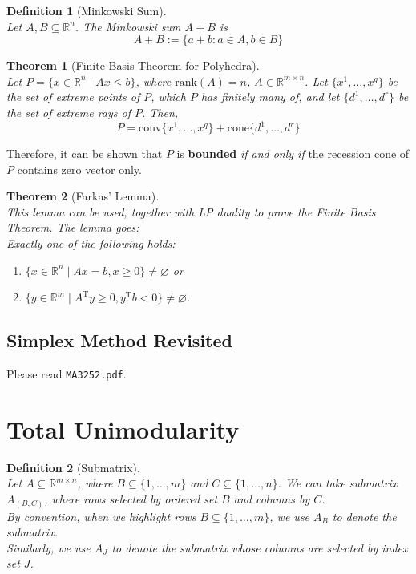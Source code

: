 \documentclass[12pt]{article}
\newcommand{\rank}{\mathrm{rank}}
\newcommand{\T}{\mathrm{T}}
\newcommand{\cone}{\mathrm{cone}}
\newcommand{\conv}{\mathrm{conv}}
\newtheorem{definition}{Definition}[section]
\newtheorem{theorem}{Theorem}[section]
\theoremstyle{definition}
\begin{document}
\begin{definition}[Minkowski Sum]
\hfill\\\normalfont Let $A,B\subseteq \mathbb{R}^n$. The Minkowski sum $A+B$ is
\[
A+B:=\{a+b: a\in A, b\in B\}
\]
\end{definition}
\begin{theorem}[Finite Basis Theorem for Polyhedra]
\hfill\\\normalfont Let $P=\{x\in\mathbb{R}^n\mid Ax\leq b\}$, where $\rank(A) = n$, $A\in\mathbb{R}^{m\times n}$. Let $\{x^1,\ldots, x^q\}$ be the set of extreme points of $P$, which $P$ has finitely many of, and let $\{d^1,\ldots, d^r\}$ be the set of extreme rays of $P$. Then,
\[
P=\conv\{x^1,\ldots, x^q\}+\cone\{d^1,\ldots, d^r\}
\]
\end{theorem}
Therefore, it can be shown that $P$ is \textbf{bounded} \textit{if and only if} the recession cone of $P$ contains zero vector only.
\begin{theorem}[Farkas' Lemma]
\hfill\\\normalfont This lemma can be used, together with LP duality to prove the Finite Basis Theorem. The lemma goes:\\
Exactly one of the following holds:
\begin{enumerate}
	\item $\{x\in\mathbb{R}^n\mid Ax=b,x\geq 0\}\neq \varnothing$ or
	\item $\{y\in\mathbb{R}^m\mid A^\T y\geq 0, y^\T b<0\}\neq \varnothing$.
\end{enumerate}
\end{theorem}
\subsection{Simplex Method Revisited}
Please read \texttt{MA3252.pdf}.
\clearpage
\section{Total Unimodularity}
\begin{definition}[Submatrix]
\hfill\\\normalfont Let $A\subseteq \mathbb{R}^{m\times n}$, where $B\subseteq \{1,\ldots, m\}$ and $C\subseteq \{1,\ldots, n\}$. We can take submatrix $A_{(B,C)}$, where rows selected by \textit{ordered} set $B$ and columns by $C$.\\

By convention, when we highlight rows $B\subseteq \{1,\ldots, m\}$, we use $A_B$ to denote the submatrix.\\

Similarly, we use $A_J$ to denote the submatrix whose columns are selected by index set $J$.
\end{definition}
\end{document}
